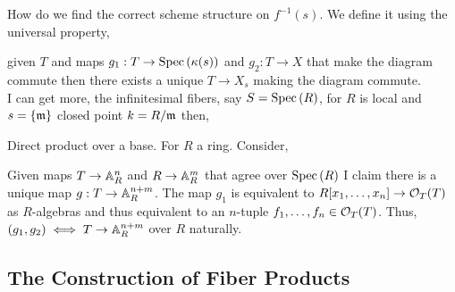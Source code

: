 \documentclass[12pt]{article}
\begin{document}
How do we find the correct scheme structure on $f^{-1}(s)$. We define it using the universal property,
\begin{center}
\end{center}
given $T$ and maps $g_1 : T \to \mathrm{Spec}\left( \kappa(s) \right)$ and $g_2 : T \to X$ that make the diagram commute then there exists a unique $T \to X_s$ making the diagram commute. 
\bigskip\\
I can get more, the infinitesimal fibers, say $S = \mathrm{Spec}\left( R \right)$, for $R$ is local and $s = \{ \mathfrak{m} \}$ closed point $k = R / \mathfrak{m}$ then,
\begin{center}
\end{center}

\begin{example}
Direct product over a base. For $R$ a ring. Consider,
\begin{center}
\end{center}
Given maps $T \to \mathbb{A}^n_R$ and $R \to \mathbb{A}^m_R$ that agree over $\mathrm{Spec}\left( R \right)$ I claim there is a unique map $g : T \to \mathbb{A}^{n+m}_R$. The map $g_1$ is equivalent to $R[x_1, \dots, x_n] \to \mathcal{O}_{T}(T)$ as $R$-algebras and thus equivalent to an $n$-tuple $f_1, \dots, f_n \in \mathcal{O}_{T}(T)$. Thus, $(g_1, g_2) \iff T \to \mathbb{A}^{n+m}_R$ over $R$ naturally. 
\end{example}

\subsection{The Construction of Fiber Products}
\end{document}
